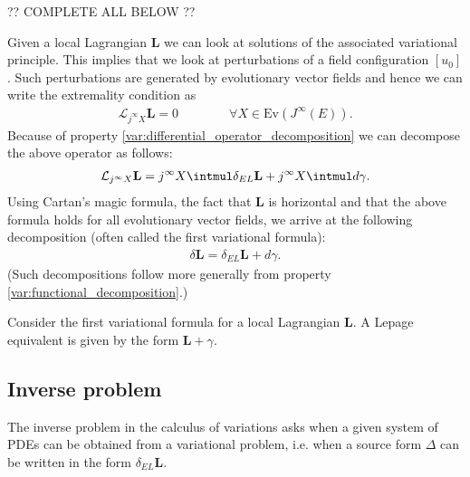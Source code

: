     ?? COMPLETE ALL BELOW ??
    \begin{property}
        Given a local Lagrangian $\mathbf{L}$ we can look at solutions of the associated variational principle. This implies that we look at perturbations of a field configuration $[u_0]$. Such perturbations are generated by evolutionary vector fields and hence we can write the extremality condition as
        \begin{gather}
            \mathcal{L}_{j^\infty X}\mathbf{L} = 0\qquad\qquad\forall X\in\text{Ev}(J^\infty(E)).
        \end{gather}
        Because of property \ref{var:differential_operator_decomposition} we can decompose the above operator as follows:
        \begin{gather}
            \mathcal{L}_{j^\infty X}\mathbf{L} = j^\infty X\intmul\delta_{EL}\mathbf{L} + j^\infty X\intmul d\gamma.
        \end{gather}
        Using Cartan's magic formula, the fact that $\mathbf{L}$ is horizontal and that the above formula holds for all evolutionary vector fields, we arrive at the following decomposition (often called the first variational formula):
        \begin{gather}
            \delta\mathbf{L} = \delta_{EL}\mathbf{L} + d\gamma.
        \end{gather}
        (Such decompositions follow more generally from property \ref{var:functional_decomposition}.)
    \end{property}

    \begin{property}
        Consider the first variational formula for a local Lagrangian $\mathbf{L}$. A Lepage equivalent is given by the form $\mathbf{L}+\gamma$.
    \end{property}

\subsection{Inverse problem}

    The inverse problem in the calculus of variations asks when a given system of PDEs can be obtained from a variational problem, i.e. when a source form $\Delta$ can be written in the form $\delta_{EL}\mathbf{L}$.

